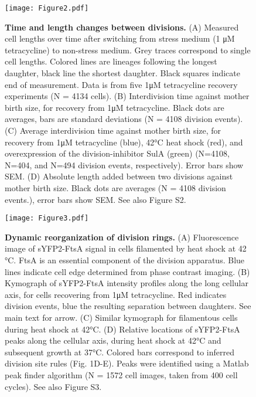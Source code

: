 \begin{figure}
    \centering
    \texttt{[image: Figure2.pdf]}
    \caption{ 
         \textbf{Time and length changes between divisions.}
         (A) Measured cell lengths over time after switching from stress medium (1 μM tetracycline) to non-stress medium. Grey traces correspond to single cell lengths. Colored lines are lineages following the longest daughter, black line the shortest daughter. Black squares indicate end of measurement. Data is from five 1μM tetracycline recovery experiments (N = 4134 cells). (B) Interdivision time against mother birth size, for recovery from 1μM tetracycline. Black dots are averages, bars are standard deviations (N = 4108 division events). (C) Average interdivision time against mother birth size, for recovery from 1μM tetracycline (blue), 42°C heat shock (red), and overexpression of the division-inhibitor SulA (green) (N=4108, N=404, and  N=494 division events, respectively). Error bars show SEM. (D) Absolute length added between two divisions against mother birth size. Black dots are averages (N = 4108 division events.), error bars show SEM. See also Figure S2.
    }
    \label{fig:filarecovery:fig2}
\end{figure}
 
\begin{figure}
    \centering
    \texttt{[image: Figure3.pdf]}
    \caption{ 
        \textbf{Dynamic reorganization of division rings.}           
         (A) Fluorescence image of sYFP2-FtsA signal in cells filamented by heat shock at 42 °C. FtsA is an essential component of the division apparatus. Blue lines indicate cell edge determined from phase contrast imaging. (B) Kymograph of sYFP2-FtsA intensity profiles along the long cellular axis, for cells recovering from 1μM tetracycline. Red indicates division events, blue the resulting separation between daughters. See main text for arrow. (C) Similar kymograph for filamentous cells during heat shock at 42°C. (D) Relative locations of sYFP2-FtsA peaks along the cellular axis, during heat shock at 42°C and subsequent growth at 37°C. Colored bars correspond to inferred division site rules (Fig. 1D-E). Peaks were identified using a Matlab peak finder algorithm (N = 1572 cell images, taken from 400 cell cycles). See also Figure S3.        
    }
    \label{fig:filarecovery:fig3}
\end{figure}

